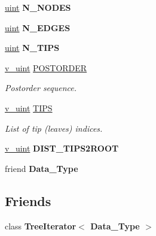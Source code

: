 \begin{DoxyCompactItemize}
\mbox{\label{classpruner_1_1Tree_a81f8f1f625ed2cef88baceb574bed43f}} 
\hyperlink{namespacepruner_a659e6e64a9e2b8e981c3d34262a2f67e}{uint} {\bfseries N\+\_\+\+N\+O\+D\+ES}
\item 
\mbox{\label{classpruner_1_1Tree_a65f0ccb58f4e24c5a83a3ba27bc1ea6d}} 
\hyperlink{namespacepruner_a659e6e64a9e2b8e981c3d34262a2f67e}{uint} {\bfseries N\+\_\+\+E\+D\+G\+ES}
\item 
\mbox{\label{classpruner_1_1Tree_a517699e71823bd36fe46d5ff4a8adda1}} 
\hyperlink{namespacepruner_a659e6e64a9e2b8e981c3d34262a2f67e}{uint} {\bfseries N\+\_\+\+T\+I\+PS}
\item 
\hyperlink{namespacepruner_af0145646bd7ede012cd336b416bc5579}{v\+\_\+uint} \hyperlink{classpruner_1_1Tree_aa93805054bcd43cca478cc5a825bc99a}{P\+O\+S\+T\+O\+R\+D\+ER}
\begin{DoxyCompactList}\small\item\em Postorder sequence. \end{DoxyCompactList}\item 
\mbox{\label{classpruner_1_1Tree_ad4cc30b688dc09db4c31107dd618976b}} 
\hyperlink{namespacepruner_af0145646bd7ede012cd336b416bc5579}{v\+\_\+uint} \hyperlink{classpruner_1_1Tree_ad4cc30b688dc09db4c31107dd618976b}{T\+I\+PS}
\begin{DoxyCompactList}\small\item\em List of tip (leaves) indices. \end{DoxyCompactList}\item 
\mbox{\label{classpruner_1_1Tree_a38626c9b9664a70b45bfdac4d634f96a}} 
\hyperlink{namespacepruner_af0145646bd7ede012cd336b416bc5579}{v\+\_\+uint} {\bfseries D\+I\+S\+T\+\_\+\+T\+I\+P\+S2\+R\+O\+OT}
\item 
\mbox{\label{classpruner_1_1Tree_ada9e2fdecd59c305d95e8ac6af278bee}} 
friend {\bfseries Data\+\_\+\+Type}
\end{DoxyCompactItemize}
\subsection*{Friends}
\begin{DoxyCompactItemize}
\item 
\mbox{\label{classpruner_1_1Tree_af28004756940ce663afb7015ce6136e9}} 
class {\bfseries Tree\+Iterator$<$ Data\+\_\+\+Type $>$}
\end{DoxyCompactItemize}


